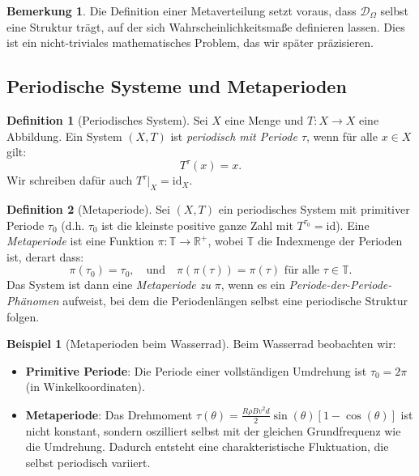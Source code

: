\documentclass[a4paper,12pt]{article}
\theoremstyle{definition}
\newtheorem{definition}{Definition}
\newtheorem{beispiel}{Beispiel}
\newtheorem{bemerkung}{Bemerkung}
\begin{document}
\begin{bemerkung}
Die Definition einer Metaverteilung setzt voraus, dass $\mathcal{D}_\Omega$ selbst eine Struktur trägt, auf der sich Wahrscheinlichkeitsmaße definieren lassen. Dies ist ein nicht-triviales mathematisches Problem, das wir später präzisieren.
\end{bemerkung}

\subsection{Periodische Systeme und Metaperioden}

\begin{definition}[Periodisches System]
Sei $X$ eine Menge und $T: X \to X$ eine Abbildung. Ein System $(X, T)$ ist \textit{periodisch mit Periode $\tau$}, wenn für alle $x \in X$ gilt:
\[
T^\tau(x) = x.
\]
Wir schreiben dafür auch $T^{\tau}|_X = \text{id}_X$.
\end{definition}

\begin{definition}[Metaperiode]
Sei $(X, T)$ ein periodisches System mit primitiver Periode $\tau_0$ (d.h. $\tau_0$ ist die kleinste positive ganze Zahl mit $T^{\tau_0} = \text{id}$). Eine \textit{Metaperiode} ist eine Funktion $\pi: \mathbb{T} \to \mathbb{R}^+$, wobei $\mathbb{T}$ die Indexmenge der Perioden ist, derart dass:
\[
\pi(\tau_0) = \tau_0, \quad \text{und} \quad \pi(\pi(\tau)) = \pi(\tau) \text{ für alle } \tau \in \mathbb{T}.
\]
Das System ist dann eine \textit{Metaperiode zu } $\pi$, wenn es ein \textit{Periode-der-Periode-Phänomen} aufweist, bei dem die Periodenlängen selbst eine periodische Struktur folgen.
\end{definition}

\begin{beispiel}[Metaperioden beim Wasserrad]
Beim Wasserrad beobachten wir:
\begin{itemize}
	\item \textbf{Primitive Periode}: Die Periode einer vollständigen Umdrehung ist $\tau_0 = 2\pi$ (in Winkelkoordinaten).
	\item \textbf{Metaperiode}: Das Drehmoment $\tau(\theta) = \frac{R\rho B v^2 d}{2}\sin(\theta)[1-\cos(\theta)]$ ist nicht konstant, sondern oszilliert selbst mit der gleichen Grundfrequenz wie die Umdrehung. Dadurch entsteht eine charakteristische Fluktuation, die selbst periodisch variiert.
\end{itemize}
\end{beispiel}
\end{document}
